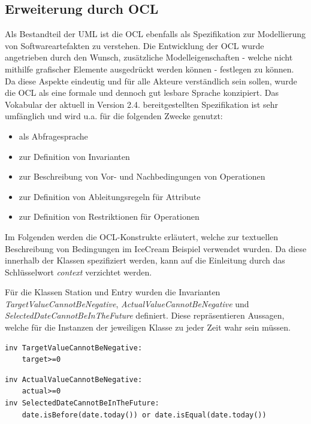\documentclass[a4paper,twoside]{article}
\begin{document}
\subsection{Erweiterung durch OCL} 
\label{ssec:ocl}
Als Bestandteil der UML ist die OCL ebenfalls als Spezifikation zur Modellierung von Softwareartefakten zu verstehen. Die Entwicklung der OCL wurde angetrieben durch den Wunsch, zusätzliche Modelleigenschaften - welche nicht mithilfe grafischer Elemente ausgedrückt werden können - festlegen zu können. \cite[S.5ff]{OCLFormal} Da diese Aspekte eindeutig und für alle Akteure verständlich sein sollen, wurde die OCL als eine formale und dennoch gut lesbare Sprache konzipiert. Das Vokabular der aktuell in Version 2.4. bereitgestellten Spezifikation ist sehr umfänglich und wird u.a. für die folgenden Zwecke genutzt: \begin{itemize}
\item als Abfragesprache
\item zur Definition von Invarianten
\item zur Beschreibung von Vor- und Nachbedingungen von Operationen 
\item zur Definition von Ableitungsregeln für Attribute
\item zur Definition von Restriktionen für Operationen
\end{itemize} 
Im Folgenden werden die OCL-Konstrukte erläutert, welche zur textuellen Beschreibung von Bedingungen im IceCream Beispiel verwendet wurden. Da diese innerhalb der Klassen spezifiziert werden, kann auf die Einleitung durch das Schlüsselwort \textit{context} verzichtet werden.  

Für die Klassen Station und Entry wurden die Invarianten \textit{TargetValueCannotBeNegative}, \textit{ActualValueCannotBeNegative} und \textit{SelectedDateCannotBeInTheFuture} definiert. Diese repräsentieren Aussagen, welche für die Instanzen der jeweiligen Klasse zu jeder Zeit wahr sein müssen. \cite[S.188]{OCLFormal}

\begin{lstlisting}[caption={Invariante in der Klasse Station}]
inv TargetValueCannotBeNegative:
	target>=0
\end{lstlisting}
\begin{lstlisting}[caption={Invarianten in der Klasse Entry}]
inv ActualValueCannotBeNegative:
	actual>=0
inv SelectedDateCannotBeInTheFuture:
	date.isBefore(date.today()) or date.isEqual(date.today())
\end{lstlisting}
\end{document}
